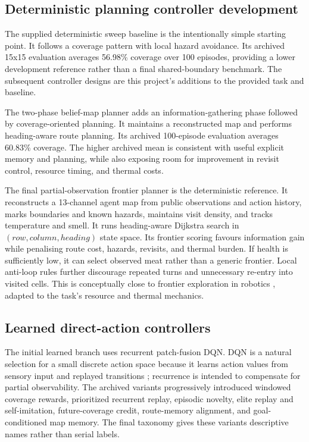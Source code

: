 \documentclass[10pt,letterpaper]{article}
\begin{document}
\subsection{Deterministic planning controller development}

The supplied deterministic sweep baseline is the intentionally simple starting point. It follows a coverage pattern with local hazard avoidance. Its archived 15x15 evaluation averages 56.98\% coverage over 100 episodes, providing a lower development reference rather than a final shared-boundary benchmark. The subsequent controller designs are this project's additions to the provided task and baseline.

The two-phase belief-map planner adds an information-gathering phase followed by coverage-oriented planning. It maintains a reconstructed map and performs heading-aware route planning. Its archived 100-episode evaluation averages 60.83\% coverage. The higher archived mean is consistent with useful explicit memory and planning, while also exposing room for improvement in revisit control, resource timing, and thermal costs.

The final partial-observation frontier planner is the deterministic reference. It reconstructs a 13-channel agent map from public observations and action history, marks boundaries and known hazards, maintains visit density, and tracks temperature and smell. It runs heading-aware Dijkstra search in $(row, column, heading)$ state space. Its frontier scoring favours information gain while penalising route cost, hazards, revisits, and thermal burden. If health is sufficiently low, it can select observed meat rather than a generic frontier. Local anti-loop rules further discourage repeated turns and unnecessary re-entry into visited cells. This is conceptually close to frontier exploration in robotics \citep{yamauchi1997frontier}, adapted to the task's resource and thermal mechanics.

\subsection{Learned direct-action controllers}

The initial learned branch uses recurrent patch-fusion DQN. DQN is a natural selection for a small discrete action space because it learns action values from sensory input and replayed transitions \citep{mnih2015human}; recurrence is intended to compensate for partial observability. The archived variants progressively introduced windowed coverage rewards, prioritized recurrent replay, episodic novelty, elite replay and self-imitation, future-coverage credit, route-memory alignment, and goal-conditioned map memory. The final taxonomy gives these variants descriptive names rather than serial labels.
\end{document}

